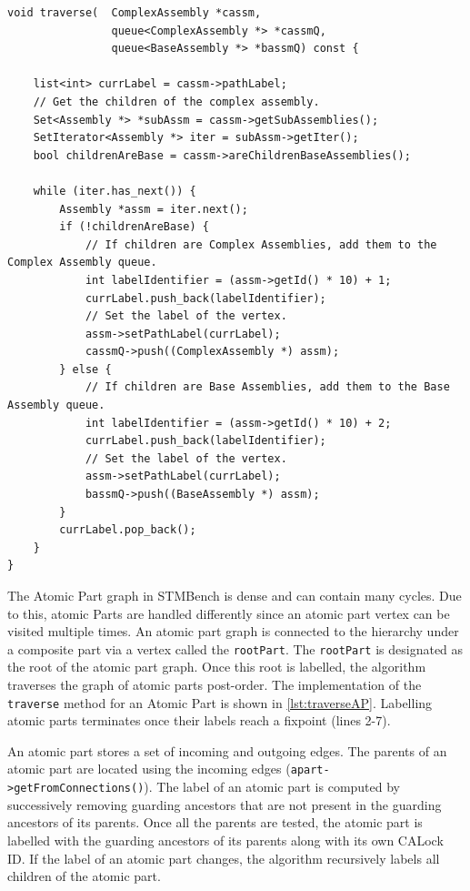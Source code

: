 \begin{lstlisting}[caption={Labelling a complex assembly},label={lst:traverseCA}]
void traverse(  ComplexAssembly *cassm, 
                queue<ComplexAssembly *> *cassmQ, 
                queue<BaseAssembly *> *bassmQ) const {

    list<int> currLabel = cassm->pathLabel;
    // Get the children of the complex assembly.
    Set<Assembly *> *subAssm = cassm->getSubAssemblies();
    SetIterator<Assembly *> iter = subAssm->getIter();
    bool childrenAreBase = cassm->areChildrenBaseAssemblies();

    while (iter.has_next()) {
        Assembly *assm = iter.next();
        if (!childrenAreBase) {
            // If children are Complex Assemblies, add them to the Complex Assembly queue.
            int labelIdentifier = (assm->getId() * 10) + 1;
            currLabel.push_back(labelIdentifier);
            // Set the label of the vertex.
            assm->setPathLabel(currLabel);
            cassmQ->push((ComplexAssembly *) assm);
        } else {
            // If children are Base Assemblies, add them to the Base Assembly queue.
            int labelIdentifier = (assm->getId() * 10) + 2;
            currLabel.push_back(labelIdentifier);
            // Set the label of the vertex.
            assm->setPathLabel(currLabel);
            bassmQ->push((BaseAssembly *) assm);
        }
        currLabel.pop_back();
    }
}
\end{lstlisting}



The Atomic Part graph in STMBench is dense and can contain many cycles. Due to this, atomic Parts are handled differently since an atomic part vertex can be visited multiple times. An atomic part graph is connected to the hierarchy under a composite part via a vertex called the \texttt{rootPart}. The \texttt{rootPart} is designated as the root of the atomic part graph. Once this root is labelled, the algorithm traverses the graph of atomic parts post-order. The implementation of the \texttt{traverse} method for an Atomic Part is shown in \cref{lst:traverseAP}. Labelling atomic parts terminates once their labels reach a fixpoint (lines 2-7). 

An atomic part stores a set of incoming and outgoing edges. The parents of an atomic part are located using the incoming edges (\texttt{apart->getFromConnections()}). The label of an atomic part is computed by successively removing guarding ancestors that are not present in the guarding ancestors of its parents. Once all the parents are tested, the atomic part is labelled with the guarding ancestors of its parents along with its own CALock ID. If the label of an atomic part changes, the algorithm recursively labels all children of the atomic part. 



